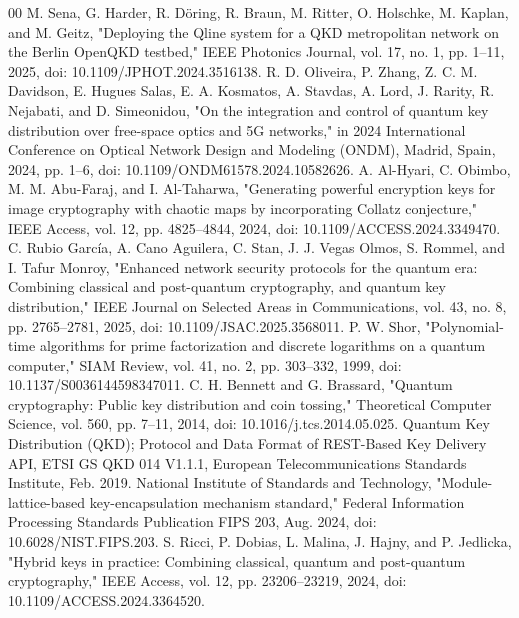 \documentclass[conference]{IEEEtran}
\begin{document}
\begin{thebibliography}{00}
 M. Sena, G. Harder, R. Döring, R. Braun, M. Ritter, O. Holschke, M. Kaplan, and M. Geitz, "Deploying the Qline system for a QKD metropolitan network on the Berlin OpenQKD testbed," IEEE Photonics Journal, vol. 17, no. 1, pp. 1–11, 2025, doi: 10.1109/JPHOT.2024.3516138.
 R. D. Oliveira, P. Zhang, Z. C. M. Davidson, E. Hugues Salas, E. A. Kosmatos, A. Stavdas, A. Lord, J. Rarity, R. Nejabati, and D. Simeonidou, "On the integration and control of quantum key distribution over free-space optics and 5G networks," in 2024 International Conference on Optical Network Design and Modeling (ONDM), Madrid, Spain, 2024, pp. 1–6, doi: 10.1109/ONDM61578.2024.10582626.
 A. Al-Hyari, C. Obimbo, M. M. Abu-Faraj, and I. Al-Taharwa, "Generating powerful encryption keys for image cryptography with chaotic maps by incorporating Collatz conjecture," IEEE Access, vol. 12, pp. 4825–4844, 2024, doi: 10.1109/ACCESS.2024.3349470.
 C. Rubio García, A. Cano Aguilera, C. Stan, J. J. Vegas Olmos, S. Rommel, and I. Tafur Monroy, "Enhanced network security protocols for the quantum era: Combining classical and post-quantum cryptography, and quantum key distribution," IEEE Journal on Selected Areas in Communications, vol. 43, no. 8, pp. 2765–2781, 2025, doi: 10.1109/JSAC.2025.3568011.
 P. W. Shor, "Polynomial-time algorithms for prime factorization and discrete logarithms on a quantum computer," SIAM Review, vol. 41, no. 2, pp. 303–332, 1999, doi: 10.1137/S0036144598347011.
 C. H. Bennett and G. Brassard, "Quantum cryptography: Public key distribution and coin tossing," Theoretical Computer Science, vol. 560, pp. 7–11, 2014, doi: 10.1016/j.tcs.2014.05.025.
 Quantum Key Distribution (QKD); Protocol and Data Format of REST-Based Key Delivery API, ETSI GS QKD 014 V1.1.1, European Telecommunications Standards Institute, Feb. 2019.
 National Institute of Standards and Technology, "Module-lattice-based key-encapsulation mechanism standard," Federal Information Processing Standards Publication FIPS 203, Aug. 2024, doi: 10.6028/NIST.FIPS.203.
 S. Ricci, P. Dobias, L. Malina, J. Hajny, and P. Jedlicka, "Hybrid keys in practice: Combining classical, quantum and post-quantum cryptography," IEEE Access, vol. 12, pp. 23206–23219, 2024, doi: 10.1109/ACCESS.2024.3364520.
\end{thebibliography}
\end{document}
